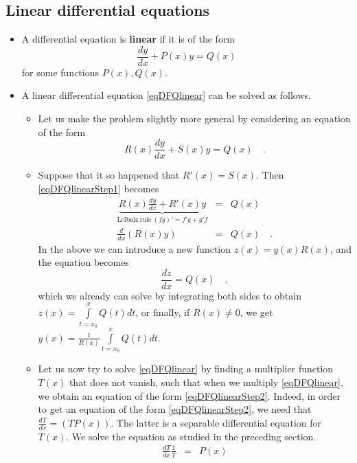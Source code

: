 \documentclass[12pt]{book}
\renewcommand{\emph}{\textbf}
\begin{document}
\subsection{Linear differential equations}
\begin{itemize}
\item A differential equation is \emph{linear} if it is of the form 
\begin{equation}\label{eqDFQlinear}
\frac{dy}{dx} + P(x)y=Q(x)
\end{equation}
for some functions $P(x),Q(x)$.
\item A linear differential equation \eqref{eqDFQlinear} can be solved as follows.
\begin{itemize}
\item  Let us make the problem slightly more general by considering an equation of the form 
\begin{equation}\label{eqDFQlinearStep1}
R(x)\frac{dy}{dx} + S(x)y=Q(x)\quad .
\end{equation}
\item Suppose that it so happened that $R'(x)=S(x)$. Then \eqref{eqDFQlinearStep1} becomes
\begin{equation}\label{eqDFQlinearStep2}
\begin{array}{rcl}
\underbrace{R(x)\frac{dy}{dx} + R'(x)y}_{\mathrm{Leibniz~rule~}(fg)'=f'g+g'f}&=&Q(x)\\
\frac{d}{dx} \left(R(x)y \right)&=& Q(x)\quad .
\end{array}
\end{equation}
In the above we can introduce a new function $z(x)= y(x)R(x)$, and the equation becomes 
\[
\frac{dz}{dx}= Q(x)\quad ,
\]
which we already can solve by integrating both sides to obtain $z(x)= \int\limits_{t=x_0}^x Q(t)dt $, or finally, if $R(x)\neq 0$, we get $y(x)= \frac{1}{R(x)}\int\limits_{t=x_0}^x Q(t)dt $.
\item Let us now try to solve \eqref{eqDFQlinear} by finding a multiplier function $T(x)$ that does not vanish, such that when we multiply \eqref{eqDFQlinear}, we obtain an equation of the form \eqref{eqDFQlinearStep2}. Indeed, in order to get an equation of the form \eqref{eqDFQlinearStep2}, we need that $\frac{dT}{dx}= (TP(x))$. The latter is a separable differential equation for $T(x)$.  We solve the equation as studied in the preceding section.
\begin{equation}\label{eqDFQlinearStep3}
\begin{array}{rcl}
\frac{dT}{dx}\frac{1}{T}&=&P(x)\\

\end{array}
\end{equation}
\end{itemize}
\end{itemize}
\end{document}
